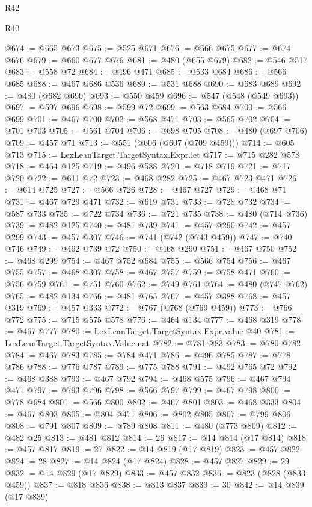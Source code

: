 \begin{lexlean}{R42}
\begin{lexlean}{R40}
\begin{coremodule}
{{{{{{{{{{{{{{{{{{{{{{{{{{{{{{{{{{{{{{{{{{{{{{{{{{{{{{{{{{{{{{{{{{{{{{{{{{{{{{{{{{{{{{{{{{{{{{{{{{{{{{{{{{{{{@674 := @665 @673
@675 := @525 @671
@676 := @666 @675
@677 := @674 @676
@679 := @660 @677 @676
@681 := @480 (@655 @679)
@682 := @546 @517
@683 := @558 @72
@684 := @496 @471
@685 := @533 @684
@686 := @566 @685
@688 := @467 @686 @536
@689 := @531 @688
@690 := @683 @689
@692 := @480 (@682 @690)
@693 := @550 @459
@696 := @547 (@548 (@549 @693))
@697 := @597 @696
@698 := @599 @72
@699 := @563 @684
@700 := @566 @699
@701 := @467 @700
@702 := @568 @471
@703 := @565 @702
@704 := @701 @703
@705 := @561 @704
@706 := @698 @705
@708 := @480 (@697 @706)
@709 := @457 @71
@713 := @551 (@606 (@607 (@709 @459)))
@714 := @605 @713
@715 := LexLeanTarget.TargetSyntax.Expr.let
@717 := @715 @282 @578
@718 := @464 @125
@719 := @496 @588
@720 := @718 @719
@721 := @717 @720
@722 := @611 @72
@723 := @468 @282
@725 := @467 @723 @471
@726 := @614 @725
@727 := @566 @726
@728 := @467 @727
@729 := @468 @71
@731 := @467 @729 @471
@732 := @619 @731
@733 := @728 @732
@734 := @587 @733
@735 := @722 @734
@736 := @721 @735
@738 := @480 (@714 @736)
@739 := @482 @125
@740 := @481 @739
@741 := @457 @290
@742 := @457 @299
@743 := @457 @307
@746 := @741 (@742 (@743 @459))
@747 := @740 @746
@749 := @492 @739 @72
@750 := @468 @290
@751 := @467 @750
@752 := @468 @299
@754 := @467 @752 @684
@755 := @566 @754
@756 := @467 @755
@757 := @468 @307
@758 := @467 @757
@759 := @758 @471
@760 := @756 @759
@761 := @751 @760
@762 := @749 @761
@764 := @480 (@747 @762)
@765 := @482 @134
@766 := @481 @765
@767 := @457 @388
@768 := @457 @319
@769 := @457 @333
@772 := @767 (@768 (@769 @459))
@773 := @766 @772
@775 := @715 @575 @578
@776 := @464 @134
@777 := @468 @319
@778 := @467 @777
@780 := LexLeanTarget.TargetSyntax.Expr.value @40
@781 := LexLeanTarget.TargetSyntax.Value.nat
@782 := @781 @83
@783 := @780 @782
@784 := @467 @783
@785 := @784 @471
@786 := @496 @785
@787 := @778 @786
@788 := @776 @787
@789 := @775 @788
@791 := @492 @765 @72
@792 := @468 @388
@793 := @467 @792
@794 := @468 @575
@796 := @467 @794 @471
@797 := @793 @796
@798 := @566 @797
@799 := @467 @798
@800 := @778 @684
@801 := @566 @800
@802 := @467 @801
@803 := @468 @333
@804 := @467 @803
@805 := @804 @471
@806 := @802 @805
@807 := @799 @806
@808 := @791 @807
@809 := @789 @808
@811 := @480 (@773 @809)
@812 := @482 @25
@813 := @481 @812
@814 := 26
@817 := @14 @814 (@17 @814)
@818 := @457 @817
@819 := 27
@822 := @14 @819 (@17 @819)
@823 := @457 @822
@824 := 28
@827 := @14 @824 (@17 @824)
@828 := @457 @827
@829 := 29
@832 := @14 @829 (@17 @829)
@833 := @457 @832
@836 := @823 (@828 (@833 @459))
@837 := @818 @836
@838 := @813 @837
@839 := 30
@842 := @14 @839 (@17 @839)
}}}}}}}}}}}}}}}}}}}}}}}}}}}}}}}}}}}}}}}}}}}}}}}}}}}}}}}}}}}}}}}}}}}}}}}}}}}}}}}}}}}}}}}}}}}}}}}}}}}}}}}}}}}}}
\end{coremodule}
\end{lexlean}
\end{lexlean}
